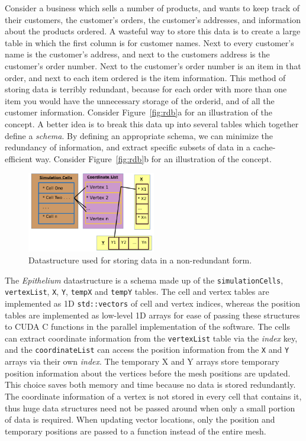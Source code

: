 Consider a business which sells a number of products, and wants to keep 
track of their customers, the customer's orders, the customer's 
addresses, and information about the products ordered. A wasteful way 
to store this data is to create a large table in which the first column 
is for customer names. Next to every customer's name is the customer's 
address, and next to the customers address is the customer's order 
number. Next to the customer's order number is an item in that order, 
and next to each item ordered is the item information. This method of 
storing data is terribly redundant, because for each order with more 
than one item you would have the unnecessary storage of the orderid, and of all 
the customer information. Consider Figure~\ref{fig:rdb}a for an illustration of the concept.
A better idea is to break this data up into several tables which 
together define a \emph{schema}. By defining an appropriate schema, we can minimize the redundancy of information, and extract specific subsets of data in a cache-efficient way. Consider Figure~\ref{fig:rdb}b for an illustration of the concept.

\begin{figure}[h]
\centering
\includegraphics[width=0.5\textwidth]{../diagrams/ds.png}
\caption{Datastructure used for storing data in a non-redundant form.}
\end{figure}

The \emph{Epithelium} datastructure is a schema made up of the \texttt{simulationCells}, \texttt{vertexList}, \texttt{X}, \texttt{Y}, \texttt{tempX} and \texttt{tempY} tables. The cell and vertex tables are implemented as 1D \texttt{std::vectors} of cell and vertex indices, whereas the position tables are implemented as low-level 1D arrays for ease of passing these structures to CUDA C functions in the parallel implementation of the software. The cells can extract coordinate information from the \texttt{vertexList} table via the \emph{index} key, and the \texttt{coordinateList} can access the position information from the \texttt{X} and \texttt{Y} arrays via their own \emph{index}. The temporary X and Y arrays store temporary position information about the vertices before the mesh positions are updated. This choice saves both memory and time because no data is stored redundantly. The coordinate information of a vertex is not stored in every cell that contains it, thus huge data structures need not be passed around when only a small portion of data is required. When updating vector locations, only the position and temporary positions are passed to a function instead of the entire mesh. 

